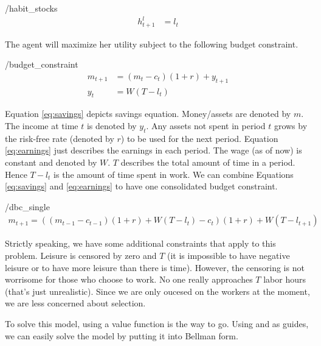 \documentclass[ProjectMMD]{subfiles}
\begin{document}
\hypertarget{habit_stocks}{}
\begin{verbatimwrite}{\EqDir/habit_stocks}
	\begin{align}
		h_{t+1}^l & = l_t \label{eq:habit}	
	\end{align}
\end{verbatimwrite}


The agent will maximize her utility subject to the following budget constraint.
\hypertarget{budget_constraint}{}
\begin{verbatimwrite}{\EqDir/budget_constraint}
  \begin{align}
    m_{t+1} & = (m_t -c_t)(1+r) + y_{t+1} \label{eq:savings} \\
    y_t &= W(T-l_t) \label{eq:earnings}
  \end{align}
\end{verbatimwrite}


Equation \eqref{eq:savings} depicts savings equation. Money/assets are denoted by $m$. The income at time $t$ is denoted by $y_t$. Any assets not spent in period $t$ grows by the risk-free rate (denoted by $r$) to be used for the next period. Equation \eqref{eq:earnings} just describes the earnings in each period. The wage (as of now) is constant and denoted by $W$. $T$ describes the total amount of time in a period. Hence $T-l_t$ is the amount of time spent in work. We can combine Equations \eqref{eq:savings} and \eqref{eq:earnings} to have one consolidated budget constraint.
\hypertarget{dbc_single}{}
\begin{verbatimwrite}{\EqDir/dbc_single}
  \begin{align}
    m_{t+1} = ((m_{t-1}-c_{t-1})(1+r) +W(T-l_t) - c_t ) (1+r) + W(T-l_{t+1}) \label{eq:dbc}
  \end{align}
\end{verbatimwrite}


Strictly speaking, we have some additional constraints that apply to this problem. Leisure is censored by zero and $T$ (it is impossible to have negative leisure or to have more leisure than there is time). However, the censoring is not worrisome for those who choose to work. No one really approaches $T$ labor hours (that's just unrealistic). Since we are only oucesed on the workers at the moment, we are less concerned about selection.  

To solve this model, using a value function is the way to go. Using \cite{carroll:solvinghabits} and \cite{kubin2002labour} as guides, we can easily solve the model by putting it into Bellman form.
\end{document}
